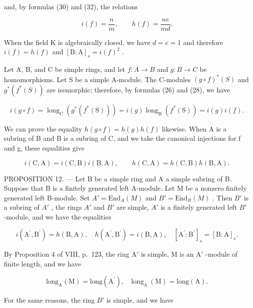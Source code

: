 and, by formulas (30) and (32), the relations

\[
i (f) = \frac {n}{m}, \qquad h (f) = \frac {n e}{m d}.
\]

When the field \(\mathrm{K}\) is algebraically closed, we have \(d = e = 1\) and therefore \(i(f) = h(f)\) and \([\mathrm{B}:\mathrm{A}]_s = i(f)^2\) .

Let A, B, and C be simple rings, and let \(f: A \to B\) and \(g: B \to C\) be homomorphisms. Let S be a simple A-module. The C-modules \((g \circ f)^{*}(S)\) and \(g^{*}(f^{*}(S))\) are isomorphic; therefore, by formulas (26) and (28), we have

\[
i (g \circ f) = \operatorname{long} _ {\mathrm{C}} \left(g ^ {*} \left(f ^ {*} (\mathrm{S})\right)\right) = i (g) \operatorname{long} _ {\mathrm{B}} \left(f ^ {*} (\mathrm{S})\right) = i (g) i (f).
\]

We can prove the equality \(h(g \circ f) = h(g)h(f)\) likewise. When A is a subring of B and B is a subring of C, and we take the canonical injections for f and g, these equalities give

\[
i (\mathrm{C}, \mathrm{A}) = i (\mathrm{C}, \mathrm{B}) i (\mathrm{B}, \mathrm{A}), \qquad h (\mathrm{C}, \mathrm{A}) = h (\mathrm{C}, \mathrm{B}) h (\mathrm{B}, \mathrm{A}).\tag{34}
\]

PROPOSITION 12. --- Let B be a simple ring and A a simple subring of B. Suppose that B is a finitely generated left A-module. Let M be a nonzero finitely generated left B-module. Set \(A' = \text{End}_{A}(M)\) and \(B' = \text{End}_{B}(M)\) . Then \(B'\) is a subring of \(A'\) , the rings \(A'\) and \(B'\) are simple, \(A'\) is a finitely generated left \(B'\) -module, and we have the equalities

\[
i (\mathrm{A} ^ {\prime}, \mathrm{B} ^ {\prime}) = h (\mathrm{B}, \mathrm{A}), \quad h (\mathrm{A} ^ {\prime}, \mathrm{B} ^ {\prime}) = i (\mathrm{B}, \mathrm{A}), \quad [ \mathrm{A} ^ {\prime}: \mathrm{B} ^ {\prime} ] _ {s} = [ \mathrm{B}: \mathrm{A} ] _ {s}.
\]

By Proposition 4 of VIII, p.~123, the ring \(\mathrm{A}'\) is simple, \(\mathrm{M}\) is an \(\mathrm{A}'\) -module of finite length, and we have

\[
\mathrm{long} _ {\mathrm{A}} (\mathrm{M}) = \mathrm{long} (\mathrm{A} ^ {\prime}), \quad \mathrm{long} _ {\mathrm{A} ^ {\prime}} (\mathrm{M}) = \mathrm{long} (\mathrm{A}).
\]

For the same reasons, the ring \(B'\) is simple, and we have

